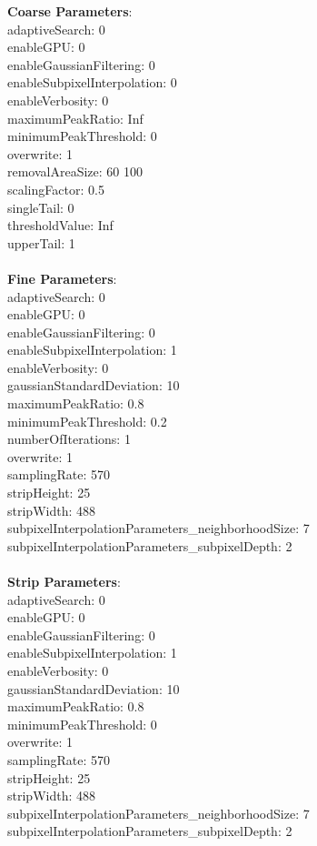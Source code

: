 \documentclass[11pt]{article}
\begin{document}
\textbf{Coarse Parameters}: \\
adaptiveSearch: 0\\
enableGPU: 0\\
enableGaussianFiltering: 0\\
enableSubpixelInterpolation: 0\\
enableVerbosity: 0\\
maximumPeakRatio: Inf\\
minimumPeakThreshold: 0\\
overwrite: 1\\
removalAreaSize: 60  100\\
scalingFactor: 0.5\\
singleTail: 0\\
thresholdValue: Inf\\
upperTail: 1\\
\\
\textbf{Fine Parameters}: \\
adaptiveSearch: 0\\
enableGPU: 0\\
enableGaussianFiltering: 0\\
enableSubpixelInterpolation: 1\\
enableVerbosity: 0\\
gaussianStandardDeviation: 10\\
maximumPeakRatio: 0.8\\
minimumPeakThreshold: 0.2\\
numberOfIterations: 1\\
overwrite: 1\\
samplingRate: 570\\
stripHeight: 25\\
stripWidth: 488\\
subpixelInterpolationParameters\_neighborhoodSize: 7\\
subpixelInterpolationParameters\_subpixelDepth: 2\\
\\
\textbf{Strip Parameters}: \\
adaptiveSearch: 0\\
enableGPU: 0\\
enableGaussianFiltering: 0\\
enableSubpixelInterpolation: 1\\
enableVerbosity: 0\\
gaussianStandardDeviation: 10\\
maximumPeakRatio: 0.8\\
minimumPeakThreshold: 0\\
overwrite: 1\\
samplingRate: 570\\
stripHeight: 25\\
stripWidth: 488\\
subpixelInterpolationParameters\_neighborhoodSize: 7\\
subpixelInterpolationParameters\_subpixelDepth: 2\\
\\
\newpage
\end{document}
